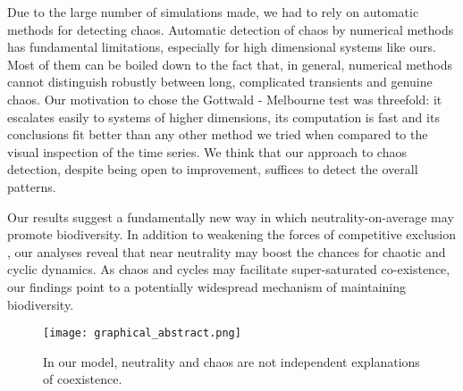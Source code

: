 Due to the large number of simulations made, we had to rely on automatic methods for detecting chaos. Automatic detection of chaos by numerical methods has fundamental limitations, especially for high dimensional systems like ours. Most of them can be boiled down to the fact that, in general, numerical methods cannot distinguish robustly between long, complicated transients and genuine chaos. Our motivation to chose the Gottwald - Melbourne test \citep{Gottwald2009} was threefold: it escalates easily to systems of higher dimensions, its computation is fast and its conclusions fit better than any other method we tried when compared to the visual inspection of the time series. We think that our approach to chaos detection, despite being open to improvement, suffices to detect the overall patterns.

Our results suggest a fundamentally new way in which neutrality-on-average may promote biodiversity. In addition to weakening the forces of competitive exclusion \citep{Scheffer2018}, our analyses reveal that near neutrality may boost the chances for chaotic and cyclic dynamics. As chaos and cycles may facilitate super-saturated co-existence, our findings point to a potentially widespread mechanism of maintaining biodiversity.

\begin{figure}
	\begin{center}
		\texttt{[image: graphical\_abstract.png]}
	\end{center}
	\caption{In our model, neutrality and chaos are not independent explanations of coexistence.}
	\label{fig:GapInKnowledge}
\end{figure}
